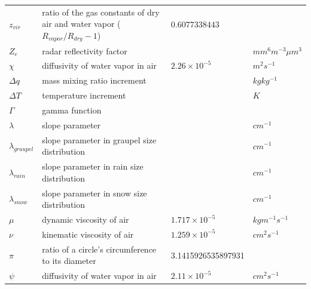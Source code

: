 \documentclass[letterpaper,titlepage,10pt]{article}
\numberwithin{equation}{section}
\begin{document}
\begin{appendices}
\begin{longtable}{p{}p{}p{}p{}}
	$z_{vir}$          & ratio of the gas constants of dry air and water vapor ($R_{vapor} / R_{dry} - 1$)    & $0.6077338443$             & \\
	$Z_e$              & radar reflectivity factor                                                            &                            & $mm^6 m^{-3} \mu m^3$ \\
	$\chi$             & diffusivity of water vapor in air                                                    & $2.26 \times 10^{-5}$      & $m^2 s^{-1}$ \\
	$\Delta q$         & mass mixing ratio increment                                                          &                            & $kg kg^{-1}$ \\
	$\Delta T$         & temperature increment                                                                &                            & $K$ \\
	$\Gamma$           & gamma function                                                                       &                            & \\
	$\lambda$          & slope parameter                                                                      &                            & $cm^{-1}$ \\
	$\lambda_{graupel}$& slope parameter in graupel size distribution                                         &                            & $cm^{-1}$ \\
	$\lambda_{rain}$   & slope parameter in rain size distribution                                            &                            & $cm^{-1}$ \\
	$\lambda_{snow}$   & slope parameter in snow size distribution                                            &                            & $cm^{-1}$ \\
	$\mu$              & dynamic viscosity of air                                                             & $1.717 \times 10^{-5}$     & $kg m^{-1} s^{-1}$ \\
	$\nu$              & kinematic viscosity of air                                                           & $1.259 \times 10^{-5}$     & $cm^2 s^{-1}$ \\
	$\pi$              & ratio of a circle's circumference to its diameter                                    & 3.1415926535897931         & \\
	$\psi$             & diffusivity of water vapor in air                                                    & $2.11 \times 10^{-5}$      & $cm^2 s^{-1}$ \\

\end{longtable}
\end{appendices}
\end{document}
